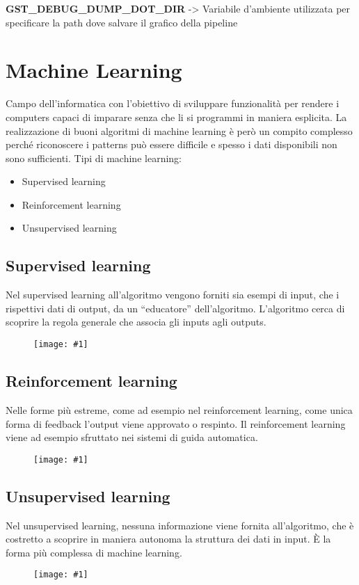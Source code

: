 \documentclass[8pt,a4paper]{article}
\newcommand{\f}[1]{
      \begin{figure}[H]
        \center
      \texttt{[image: \#1]}
      \end{figure}
}
\begin{document}
\begin{multicols}{5}
    \textbf{GST\_DEBUG\_DUMP\_DOT\_DIR} ->  Variabile d’ambiente utilizzata per specificare la path dove salvare il grafico della pipeline
    

    \section{Machine Learning}
    Campo dell'informatica con l'obiettivo di sviluppare funzionalità per rendere
    i computers capaci di imparare senza che li si programmi in maniera esplicita.
    La realizzazione di buoni algoritmi di machine learning è però un compito complesso
    perché riconoscere i patterns può essere difficile e spesso i dati disponibili
    non sono sufficienti.
    Tipi di machine learning:
    \begin{itemize}
    \item Supervised learning
    \item Reinforcement learning
    \item Unsupervised learning
    \end{itemize}
    
    \subsection{Supervised learning}
    Nel supervised learning all’algoritmo vengono forniti sia esempi di input, che i
    rispettivi dati di output, da un “educatore” dell’algoritmo. L’algoritmo cerca di
    scoprire la regola generale che associa gli inputs agli outputs.
    \f{SupervisedLearning}
    
    \subsection{Reinforcement learning}
    Nelle forme più estreme, come ad esempio nel reinforcement learning, come unica
    forma di feedback l’output viene approvato o respinto. Il reinforcement learning
    viene ad esempio sfruttato nei sistemi di guida automatica.
    \f{ReinforcementLearning}
    
    \subsection{Unsupervised learning}
    Nel unsupervised learning, nessuna informazione viene fornita all’algoritmo, che
    è costretto a scoprire in maniera autonoma la struttura dei dati in input. È la
    forma più complessa di machine learning.
    \f{UnsupervisedLearning}
    

\end{multicols}
\end{document}
